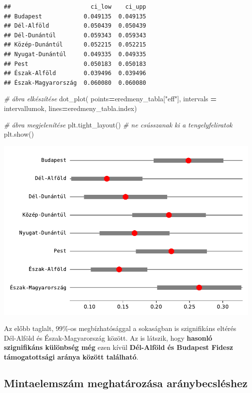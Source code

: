 \documentclass[
]{book}
\newenvironment{Shaded}{\begin{snugshade}}{\end{snugshade}}
\newcommand{\CommentTok}[1]{\textcolor[rgb]{0.56,0.35,0.01}{\textit{#1}}}
\newcommand{\NormalTok}[1]{#1}
\newcommand{\OperatorTok}[1]{\textcolor[rgb]{0.81,0.36,0.00}{\textbf{#1}}}
\newcommand{\StringTok}[1]{\textcolor[rgb]{0.31,0.60,0.02}{#1}}
\begin{document}
\begin{verbatim}
##                       ci_low    ci_upp
## Budapest            0.049135  0.049135
## Dél-Alföld          0.050439  0.050439
## Dél-Dunántúl        0.059343  0.059343
## Közép-Dunántúl      0.052215  0.052215
## Nyugat-Dunántúl     0.049335  0.049335
## Pest                0.050183  0.050183
## Észak-Alföld        0.039496  0.039496
## Észak-Magyarország  0.060080  0.060080
\end{verbatim}

\begin{Shaded}
\begin{Highlighting}[]
\CommentTok{\# ábra elkészítése}
\NormalTok{dot\_plot(}
\NormalTok{  points}\OperatorTok{=}\NormalTok{eredmeny\_tabla[}\StringTok{"eff"}\NormalTok{],}
\NormalTok{  intervals }\OperatorTok{=}\NormalTok{ intervallumok,}
\NormalTok{  lines}\OperatorTok{=}\NormalTok{eredmeny\_tabla.index)}

\CommentTok{\# ábra megjelenítése}
\NormalTok{plt.tight\_layout() }\CommentTok{\# ne csússzanak ki a tengelyfeliratok}
\NormalTok{plt.show()}
\end{Highlighting}
\end{Shaded}

\includegraphics{_main_files/figure-latex/unnamed-chunk-290-15.pdf}

Az előbb taglalt, 99\%-os megbízhatósággal a sokaságban is szignifikáns eltérés Dél-Alföld és Észak-Magyarország között. Az is látszik, hogy \textbf{hasonló szignifikáns különbség még} ezen kívül \textbf{Dél-Alföld és Budapest Fidesz támogatottsági aránya között található}.

\subsection{Mintaelemszám meghatározása aránybecsléshez}\label{mintaelemszuxe1m-meghatuxe1rozuxe1sa-aruxe1nybecsluxe9shez}
\end{document}
